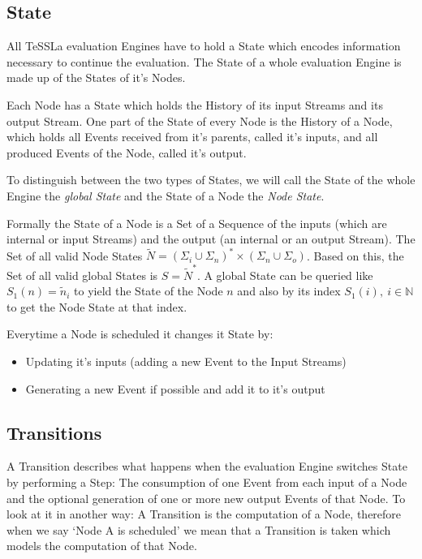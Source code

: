 \subsection{State}
\label{sec:concepts:def:state}

All TeSSLa evaluation Engines have to hold a State which encodes information necessary to continue the evaluation.
The State of a whole evaluation Engine is made up of the States of it's Nodes.

Each Node has a State which holds the History of its input Streams and its output Stream.
One part of the State of every Node is the History of a Node, which holds all Events received from it's parents, called it's inputs, and all produced Events of the Node, called it's output.

To distinguish between the two types of States, we will call the State of the whole Engine the \emph{global State} and the State of a Node the \emph{Node State}.

Formally the State of a Node is a  Set of a Sequence of the inputs (which are internal or input Streams) and the output (an internal or an output Stream).
The Set of all valid Node States \(\widetilde{N} = {(\Sigma_i \cup \Sigma_n)}^*\times(\Sigma_n \cup \Sigma_o)\).
Based on this, the Set of all valid global States is \(S = \widetilde{N}^*\).
A global State can be queried like \(S_1(n) = \widetilde{n}_i\) to yield the State of the Node \(n\) and also by its index \(S_1(i),\ i \in \mathbb{N}\) to get the Node State at that index.

Everytime a Node is scheduled it changes it State by:

\begin{itemize}
  \item Updating it's inputs (adding a new Event to the Input Streams)
  \item Generating a new Event if possible and add it to it's output
\end{itemize}

\subsection{Transitions}
\label{sec:concepts:def:transitions}

A Transition describes what happens when the evaluation Engine switches State by performing a Step:
The consumption of one Event from each input of a Node and the optional generation of one or more new output Events of that Node.
To look at it in another way: A Transition is the computation of a Node, therefore when we say `Node A is scheduled' we mean that a Transition is taken which models the computation of that Node.

